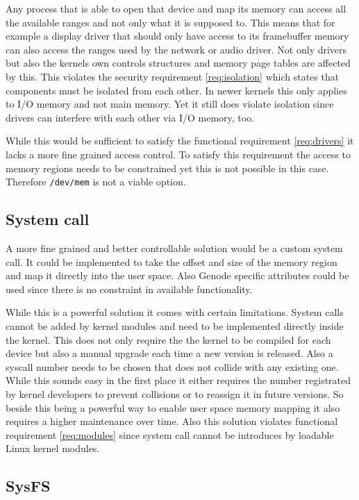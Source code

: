 \documentclass[
a4paper,
11pt,
twoside
]{report}
\begin{document}
		Any process that is able to open that device and map its memory can access all the available ranges and not only what it is supposed to.
		This means that for example a display driver that should only have access to its framebuffer memory can also access the ranges used by the network or audio driver.
		Not only drivers but also the kernels own controls structures and memory page tables are affected by this.
		This violates the security requirement \ref{req:isolation} which states that components must be isolated from each other.
		In newer kernels this only applies to I/O memory and not main memory.
		Yet it still does violate isolation since drivers can interfere with each other via I/O memory, too. \citep{devmem}
		
		While this would be sufficient to satisfy the functional requirement \ref{req:drivers} it lacks a more fine grained access control.
		To satisfy this requirement the access to memory regions needs to be constrained yet this is not possible in this case.
		Therefore \texttt{/dev/mem} is not a viable option.
		
		\subsection{System call}
		
		A more fine grained and better controllable solution would be a custom system call.
		It could be implemented to take the offset and size of the memory region and map it directly into the user space.
		Also Genode specific attributes could be used since there is no constraint in available functionality.
		
		While this is a powerful solution it comes with certain limitations.
		System calls cannot be added by kernel modules and need to be implemented directly inside the kernel.
		This does not only require the the kernel to be compiled for each device but also a manual upgrade each time a new version is released.
		Also a syscall number needs to be chosen that does not collide with any existing one.
		While this sounds easy in the first place it either requires the number registrated by kernel developers to prevent collisions or to reassign it in future versions.
		So beside this being a powerful way to enable user space memory mapping it also requires a higher maintenance over time.
		Also this solution violates functional requirement \ref{req:modules} since system call cannot be introduces by loadable Linux kernel modules. \citep{syscall}
		
		\subsection{SysFS}
		
\end{document}
